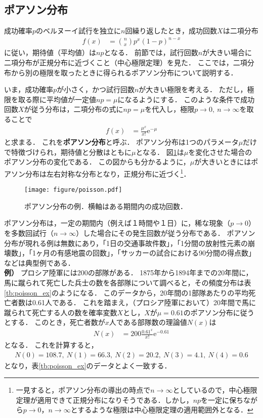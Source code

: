 \subsection{ポアソン分布}
%
成功確率$ p $のベルヌーイ試行を独立に$ n $回繰り返したとき，成功回数$ X $は二項分布
%
\begin{align*}
	f(x) &= \binom{n}{x}p^{x}(1-p)^{n-x}
\end{align*}
%
に従い，期待値（平均値）は$ np $となる．
%
前節では，試行回数$ n $が大きい場合に二項分布が正規分布に近づくこと（中心極限定理）を見た．
%
ここでは，二項分布から別の極限を取ったときに得られるポアソン分布について説明する．
%

%
いま，成功確率$ p $が小さく，かつ試行回数$ n $が大きい極限を考える．
%
ただし，極限を取る際に平均値が一定値$ np=\mu $になるようにする．
%
このような条件で成功回数$ X $が従う分布は，二項分布の式に$ np=\mu $を代入し，極限$ p\to 0,\ n\to \infty $を取ることで
%
\begin{align}
	f(x) &= \frac{\mu^{x}}{x!} \mathrm{e}^{-\mu}
	\label{eq:poisson}
\end{align}
%
と求まる．
%
これを\textbf{ポアソン分布}と呼ぶ．
%
ポアソン分布は1つのパラメータ$ \mu $だけで特徴づけられ，期待値と分散はともに$ \mu $となる．
%
図\ref{fig:poisson}は$ \mu $を変化させた場合のポアソン分布の変化である．
%
この図からも分かるように，$ \mu $が大きいときにはポアソン分布は左右対称な分布となり，正規分布に近づく\footnote{一見すると，ポアソン分布の導出の時点で$ n\to \infty $としているので，中心極限定理が適用できて正規分布になりそうである．しかし，$ np $を一定に保ちながら$ p\to 0 $，$ n\to \infty $とするような極限は中心極限定理の適用範囲外となる．}．
%

%
\begin{figure}[H]
	\centering
	\texttt{[image: figure/poisson.pdf]}
	\caption{ポアソン分布の例．横軸はある期間内の成功回数．}
	\label{fig:poisson}
\end{figure}
%


%
ポアソン分布は，一定の期間内（例えば１時間や１日）に，稀な現象（$ p\to 0 $）を多数回試行（$ n\to \infty $）した場合にその発生回数が従う分布である．
%
ポアソン分布が現れる例は無数にあり，「1日の交通事故件数」，「1分間の放射性元素の崩壊数」，「1ヶ月の有感地震の回数」，「サッカーの試合における90分間の得点数」などは典型例である．\\
%

\noindent \textbf{例）}
%
プロシア陸軍には200の部隊がある．
%
1875年から1894年までの20年間に，馬に蹴られて死亡した兵士の数を各部隊について調べると，その頻度分布は表\ref{tb:poisson_ex}のようになる．
%
このデータから，20年間の1部隊あたりの平均死亡者数は0.61人である．
%
これを踏まえ，（プロシア陸軍において）20年間で馬に蹴られて死亡する人の数を確率変数$ X $とし，$ X $が$ \mu=0.61 $のポアソン分布に従うとする．
%
このとき，死亡者数が$ x $人である部隊数の理論値$ N(x) $は
%
\begin{align*}
	N(x) &= 200 \frac{0.61^{x}}{x!} \mathrm{e}^{-0.61}
\end{align*}
%
となる．
%
これを計算すると，
%
\begin{align*}
	N(0) = 108.7,\ N(1)=66.3,\ N(2)=20.2,\ N(3)=4.1,\ N(4)=0.6
\end{align*}
%
となり，表\ref{tb:poisson_ex}のデータとよく一致する．
%


